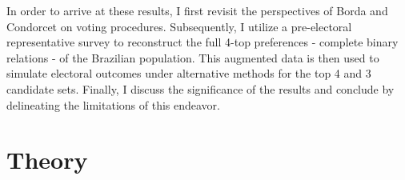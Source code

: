 \documentclass[hidelinks,11pt]{article} \usepackage[utf8]{inputenc}
\begin{document}
In order to arrive at these results, I first revisit the perspectives of Borda and Condorcet on voting procedures. Subsequently, I utilize a pre-electoral representative survey to reconstruct the full 4-top preferences - complete binary relations -  of the Brazilian population. This augmented data is then used to simulate electoral outcomes under alternative methods for the top 4 and 3 candidate sets. Finally, I discuss the significance of the results and conclude by delineating the limitations of this endeavor.

\section{Theory}

\end{document}
